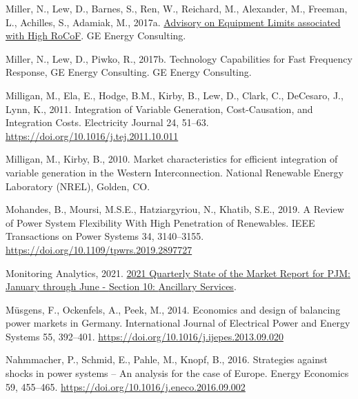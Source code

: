 \documentclass[12pt,a4paper,]{report}
\newlength{\cslhangindent}
\newenvironment{CSLReferences}[2] %
 {%
  \setlength{\parindent}{0pt}
  \ifodd #1 \everypar{\setlength{\hangindent}{\cslhangindent}}\ignorespaces\fi
  \ifnum #2 > 0
  \setlength{\parskip}{#2\baselineskip}
  \fi
 }%
 {}
\begin{document}
\begin{CSLReferences}{1}{0}
\leavevmode{}%
Miller, N., Lew, D., Barnes, S., Ren, W., Reichard, M., Alexander, M.,
Freeman, L., Achilles, S., Adamiak, M., 2017a.
\href{https://www.aemo.com.au/-/media/Files/Electricity/NEM/Security_and_Reliability/Reports/2017/20170904-GE-RoCoF-Advisory}{Advisory
on {Equipment Limits} associated with {High RoCoF}}. GE Energy
Consulting.

\leavevmode{}%
Miller, N., Lew, D., Piwko, R., 2017b. Technology {Capabilities} for
{Fast Frequency Response}, GE Energy Consulting. GE Energy Consulting.

\leavevmode{}%
Milligan, M., Ela, E., Hodge, B.M., Kirby, B., Lew, D., Clark, C.,
DeCesaro, J., Lynn, K., 2011. Integration of {Variable Generation},
{Cost-Causation}, and {Integration Costs}. Electricity Journal 24,
51--63. \url{https://doi.org/10.1016/j.tej.2011.10.011}

\leavevmode{}%
Milligan, M., Kirby, B., 2010. Market characteristics for efficient
integration of variable generation in the {Western Interconnection}.
National Renewable Energy Laboratory (NREL), Golden, CO.

\leavevmode{}%
Mohandes, B., Moursi, M.S.E., Hatziargyriou, N., Khatib, S.E., 2019. A
{Review} of {Power System Flexibility With High Penetration} of
{Renewables}. IEEE Transactions on Power Systems 34, 3140--3155.
\url{https://doi.org/10.1109/tpwrs.2019.2897727}

\leavevmode{}%
Monitoring Analytics, 2021.
\href{https://www.monitoringanalytics.com/reports/PJM_State_of_the_Market/2021.shtml}{2021
{Quarterly State} of the {Market Report} for {PJM}: {January} through
{June} - {Section} 10: {Ancillary Services}}.

\leavevmode{}%
Müsgens, F., Ockenfels, A., Peek, M., 2014. Economics and design of
balancing power markets in {Germany}. International Journal of
Electrical Power and Energy Systems 55, 392--401.
\url{https://doi.org/10.1016/j.ijepes.2013.09.020}

\leavevmode{}%
Nahmmacher, P., Schmid, E., Pahle, M., Knopf, B., 2016. Strategies
against shocks in power systems -- {An} analysis for the case of
{Europe}. Energy Economics 59, 455--465.
\url{https://doi.org/10.1016/j.eneco.2016.09.002}


\end{CSLReferences}
\end{document}
